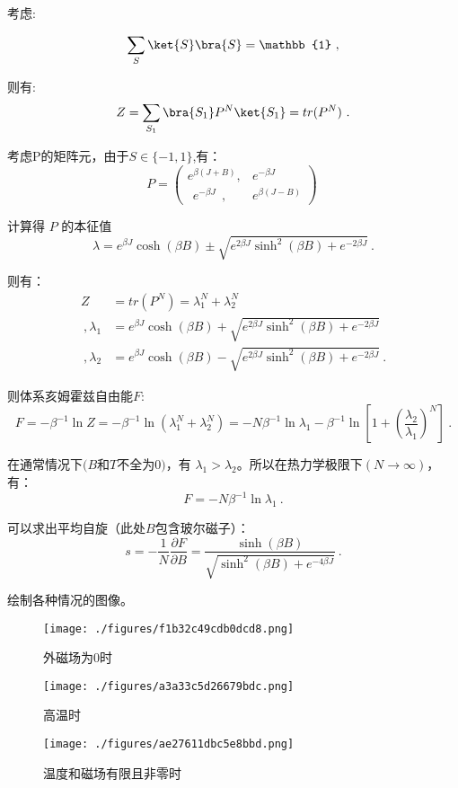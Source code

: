 考虑:

\begin{equation}
\sum_S\ket{S}\bra{S}=\mathbb{1}~,
\end{equation}

则有:
\begin{equation}
Z=\sum\limits_{S_1}\bra{S_1}P^N\ket{S_1}=tr(P^N)~.
\end{equation}

考虑P的矩阵元，由于$S\in\{-1,1\}$,有：
$$P=\begin{pmatrix}
e^{\beta(J+B)},&e^{-\beta J} \\
~~e^{-\beta J}~~, & e^{\beta(J-B)}
\end{pmatrix}~$$

计算得 $P$ 的本征值
$$\lambda=e^{\beta J}\cosh{(\beta B)}\pm \sqrt{e^{2\beta J }\sinh^2{(\beta B)}+e^{-2\beta J }}~.$$

则有：
\begin{align}
Z&=tr(P^N)=\lambda_1^N+\lambda_2^N \\~,
\lambda_1&=e^{\beta J}\cosh{(\beta B)}+ \sqrt{e^{2\beta J }\sinh^2{(\beta B)}+e^{-2\beta J }} \\~,
\lambda_2&=e^{\beta J}\cosh{(\beta B)}- \sqrt{e^{2\beta J }\sinh^2{(\beta B)}+e^{-2\beta J }}~.
\end{align}

则体系亥姆霍兹自由能$F$:
$$F=-\beta^{-1}\ln{Z}=-\beta^{-1}\ln{(\lambda_1^N+\lambda_2^N)}=-N\beta^{-1}\ln{\lambda_1}-\beta^{-1}\ln[1+(\frac{\lambda_2}{\lambda_1})^N]~.$$

在通常情况下$(B$和$T$不全为$0)$，有 $\lambda_1>\lambda_2$。所以在热力学极限下$(N\rightarrow\infty)$，有：
$$F=-N\beta^{-1}\ln{\lambda_1}~.$$

可以求出平均自旋（此处$B$包含玻尔磁子）：
$$s=-\frac{1}{N}\frac{\partial F}{\partial B}=\frac{\sinh(\beta B)}{\sqrt{\sinh^2(\beta B)+e^{-4\beta J}}}~.$$

绘制各种情况的图像。

\begin{figure}[ht]
\centering
\texttt{[image: ./figures/f1b32c49cdb0dcd8.png]}
\caption{外磁场为0时} \label{fig_Ising_1}
\end{figure}

\begin{figure}[ht]
\centering
\texttt{[image: ./figures/a3a33c5d26679bdc.png]}
\caption{高温时} \label{fig_Ising_2}
\end{figure}

\begin{figure}[ht]
\centering
\texttt{[image: ./figures/ae27611dbc5e8bbd.png]}
\caption{温度和磁场有限且非零时} \label{fig_Ising_3}
\end{figure}

